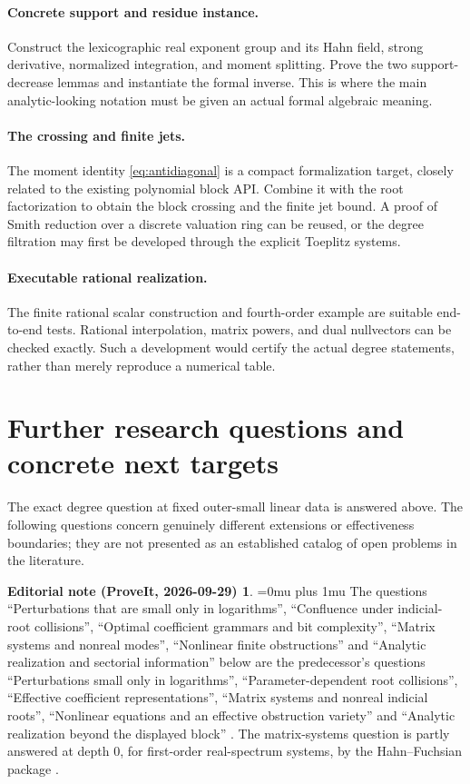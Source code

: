 \documentclass[11pt,a4paper]{article}
\numberwithin{equation}{section}
\theoremstyle{definition}
\theoremstyle{remark}
\theoremstyle{definition}
\newtheorem*{ednoteinner}{Editorial note (ProveIt, 2026-09-29)}
\newenvironment{ednote}{\begin{ednoteinner}\sloppy\Urlmuskip=0mu plus 1mu\relax}{\end{ednoteinner}}
\begin{document}
\paragraph{Concrete support and residue instance.}
Construct the lexicographic real exponent group and its Hahn field, strong derivative, normalized integration, and moment splitting. Prove the two support-decrease lemmas and instantiate the formal inverse. This is where the main analytic-looking notation must be given an actual formal algebraic meaning.

\paragraph{The crossing and finite jets.}
The moment identity \eqref{eq:antidiagonal} is a compact formalization target, closely related to the existing polynomial block API. Combine it with the root factorization to obtain the block crossing and the finite jet bound. A proof of Smith reduction over a discrete valuation ring can be reused, or the degree filtration may first be developed through the explicit Toeplitz systems.

\paragraph{Executable rational realization.}
The finite rational scalar construction and fourth-order example are suitable end-to-end tests. Rational interpolation, matrix powers, and dual nullvectors can be checked exactly. Such a development would certify the actual degree statements, rather than merely reproduce a numerical table.

\section{Further research questions and concrete next targets}
\label{sec:future}
The exact degree question at fixed outer-small linear data is answered above. The following questions concern genuinely different extensions or effectiveness boundaries; they are not presented as an established catalog of open problems in the literature.
\begin{ednote}
The questions ``Perturbations that are small only in logarithms'', ``Confluence under indicial-root collisions'', ``Optimal coefficient grammars and bit complexity'', ``Matrix systems and nonreal modes'', ``Nonlinear finite obstructions'' and ``Analytic realization and sectorial information'' below are the predecessor's questions ``Perturbations small only in logarithms'', ``Parameter-dependent root collisions'', ``Effective coefficient representations'', ``Matrix systems and nonreal indicial roots'', ``Nonlinear equations and an effective obstruction variety'' and ``Analytic realization beyond the displayed block'' \cite{repo-residue}. The matrix-systems question is partly answered at depth $0$, for first-order real-spectrum systems, by the Hahn--Fuchsian package \cite{ed:hfr}.
\end{ednote}
\end{document}
